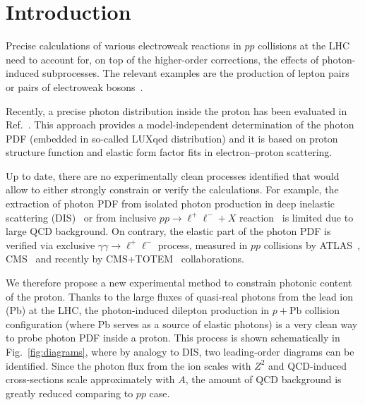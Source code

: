 \section{Introduction}

Precise calculations of various electroweak reactions in $pp$ collisions at the LHC need to account for, on top of the higher-order corrections, the effects of photon-induced subprocesses.
The relevant examples are the production of lepton pairs~\cite{Aad:2014qja, Aad:2016zzw,Accomando:2016tah, Luszczak:2015aoa, Harland-Lang:2016apc} or pairs of electroweak bosons~\cite{Luszczak:2014mta, Denner:2015fca, Dyndal:2015hrp, Ababekri:2016kkj, Biedermann:2016guo, Biedermann:2016yvs, Yong:2016njr, Luszczak:2018ntp}.


Recently, a precise photon distribution inside the proton has been evaluated in Ref.~\cite{Manohar:2016nzj}.
This approach provides a model-independent determination of the photon PDF (embedded in so-called LUXqed distribution)
and  it is based on proton structure function and elastic form factor fits in electron--proton scattering.

Up to date, there are no experimentally clean processes identified that would allow to either strongly constrain or verify the calculations.
For example, the extraction of photon PDF from isolated photon production in deep inelastic scattering (DIS)~\cite{Schmidt:2015zda} 
or from inclusive $pp\rightarrow\ell^+\ell^-+X$ reaction~\cite{Ball:2013hta, Aad:2016zzw, Giuli:2017oii} is limited due to large QCD background.
On contrary, the elastic part of the photon PDF is verified via exclusive $\gamma\gamma\rightarrow\ell^+\ell^-$ process, measured in $pp$ collisions by ATLAS~\cite{Aad:2015bwa,Aaboud:2017oiq}, CMS~\cite{Chatrchyan:2011ci,Chatrchyan:2012tv} and recently by CMS+TOTEM~\cite{Cms:2018het} collaborations.


We therefore propose a new experimental method to constrain photonic content of the proton.
Thanks to the large fluxes of quasi-real photons from the lead ion (Pb) at the LHC, the photon-induced dilepton production in $p+\textrm{Pb}$ collision configuration (where Pb serves as a source of elastic photons) is a very clean way to probe photon PDF inside a proton. 
This process is shown schematically in Fig.~\ref{fig:diagrams}, where by analogy to DIS, two leading-order diagrams can be identified.
Since the photon flux from the ion scales with $Z^2$ and QCD-induced cross-sections scale approximately with $A$,
the amount of QCD background is greatly reduced comparing to $pp$ case.

